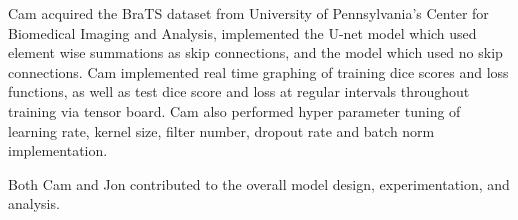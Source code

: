 \documentclass{article}
\begin{document}
Cam acquired the BraTS dataset from University of Pennsylvania’s Center for Biomedical Imaging and Analysis, implemented the U-net model which used element wise summations as skip connections, and the model which used no skip connections. Cam implemented real time graphing of training dice scores and loss functions, as well as test dice score and loss at regular intervals throughout training via tensor board. Cam also performed hyper parameter tuning of learning rate, kernel size, filter number, dropout rate and batch norm implementation.


Both Cam and Jon contributed to the overall model design, experimentation, and analysis.



\end{document}
